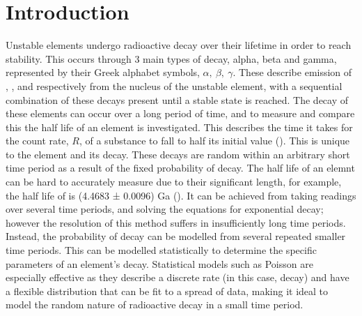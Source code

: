 \documentclass[11pt]{article}
\begin{document}
    \section{Introduction}
    Unstable elements undergo radioactive decay over their lifetime in order to reach stability. This occurs through 3 main types of decay, alpha, beta and gamma, represented by their Greek alphabet symbols, $\alpha,\  \beta,\ \gamma$.  These describe emission of , , and  respectively from the nucleus of the unstable element, with a sequential combination of these decays present until a stable state is reached. The decay of these elements can occur over a long period of time, and to measure and compare this the half life of an element is investigated. This describes the time it takes for the count rate, $R$, of a substance to fall to half its initial value (\cite{Magill2005}). This is unique to the element and its decay.
    These decays are random within an arbitrary short time period as a result of the fixed probability of decay. The half life of an elemnt can be hard to accurately measure due to their significant length, for example, the half life of  is (4.4683 ± 0.0096) Ga (\cite{U238}).  It can be achieved from taking readings over several time periods, and solving the equations for exponential decay; however the resolution of this method suffers in insufficiently long time periods. Instead, the probability of decay can be modelled from several repeated smaller time periods. This can be modelled statistically to determine the  specific parameters of an element's decay. Statistical models such as Poisson are especially effective as they describe a discrete rate (in this case, decay) and have a flexible distribution that can be fit to a spread of data, making it ideal to model the random nature of radioactive decay in a small time period. 
    
\end{document}
